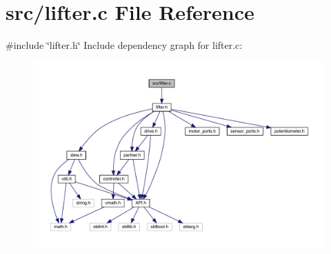 \section{src/lifter.c File Reference}
\label{lifter_8c}
{\ttfamily \#include \char`\"{}lifter.\+h\char`\"{}}\newline
Include dependency graph for lifter.\+c\+:\nopagebreak
\begin{figure}[H]
\begin{center}
\leavevmode
\includegraphics[width=350pt]{lifter_8c__incl}
\end{center}
\end{figure}
